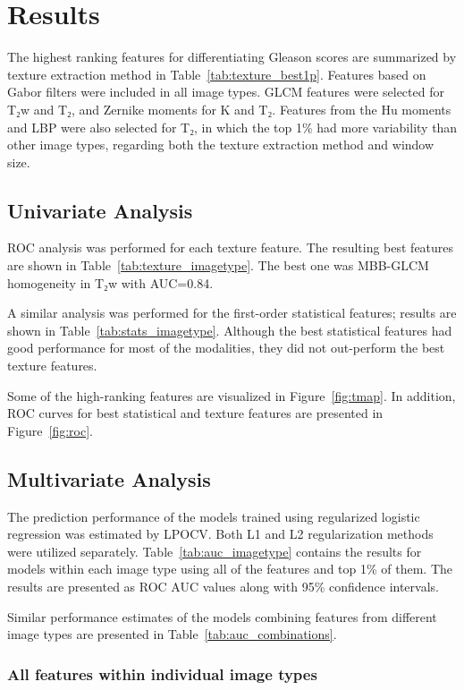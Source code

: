 \section{Results}

The highest ranking features for differentiating Gleason scores are summarized
by texture extraction method in Table~\ref{tab:texture_best1p}. Features based
on Gabor filters were included in all image types. GLCM features were selected
for T₂w and T₂, and Zernike moments for K and T₂. Features from the Hu
moments and LBP were also selected for T₂, in which the top 1\% had more
variability than other image types, regarding both the texture extraction method
and window size.


\subsection{Univariate Analysis}

ROC analysis was performed for each texture feature. The resulting best features
are shown in Table~\ref{tab:texture_imagetype}. The best one was MBB-GLCM
homogeneity in T₂w with AUC=0.84.

A similar analysis was performed for the first-order statistical features;
results are shown in Table~\ref{tab:stats_imagetype}. Although the best
statistical features had good performance for most of the modalities, they did
not out-perform the best texture features.

Some of the high-ranking features are visualized in Figure~\ref{fig:tmap}. In
addition, ROC curves for best statistical and texture features are presented in
Figure~\ref{fig:roc}.


\subsection{Multivariate Analysis}

The prediction performance of the models trained using regularized logistic
regression was estimated by LPOCV\@. Both L1 and L2 regularization methods were
utilized separately. Table~\ref{tab:auc_imagetype} contains the results for
models within each image type using all of the features and top 1\% of them. The
results are presented as ROC AUC values along with 95\% confidence intervals.

Similar performance estimates of the models combining features from different
image types are presented in Table~\ref{tab:auc_combinations}.


\subsubsection{All features within individual image types}

